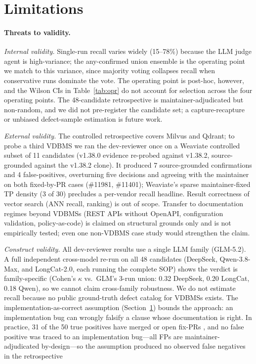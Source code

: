 \documentclass[sigconf]{acmart}
\begin{document}
\section{Limitations}
\label{sec:limit}

\paragraph{Threats to validity.}
\emph{Internal validity.} Single-run recall varies widely (15--78\%) because the LLM judge agent is high-variance; the any-confirmed union ensemble is the operating point we match to this variance, since majority voting collapses recall when conservative runs dominate the vote. The operating point is post-hoc, however, and the Wilson CIs in Table~\ref{tab:opr} do not account for selection across the four operating points. The 48-candidate retrospective is maintainer-adjudicated but non-random, and we did not pre-register the candidate set; a capture-recapture or unbiased defect-sample estimation is future work.

\emph{External validity.} The controlled retrospective covers Milvus and Qdrant; to probe a third VDBMS we ran the dev-reviewer once on a Weaviate controlled subset of 11 candidates (v1.38.0 evidence re-probed against v1.38.2, source-grounded against the v1.38.2 clone). It produced 7 source-grounded confirmations and 4 false-positives, overturning five  decisions and agreeing with the maintainer on both fixed-by-PR cases (\#11981, \#11401); Weaviate's sparse maintainer-fixed TP density (3 of 30) precludes a per-vendor recall headline. Result correctness of vector search (ANN recall, ranking) is out of scope. Transfer to documentation regimes beyond VDBMSs (REST APIs without OpenAPI, configuration validation, policy-as-code) is claimed on structural grounds only and is not empirically tested; even one non-VDBMS case study would strengthen the claim.

\emph{Construct validity.} All dev-reviewer results use a single LLM family (GLM-5.2). A full independent cross-model re-run on all 48 candidates (DeepSeek, Qwen-3.8-Max, and LongCat-2.0, each running the complete SOP) shows the verdict is family-specific (Cohen's $\kappa$ vs.\ GLM's 3-run union: 0.32 DeepSeek, 0.20 LongCat, 0.18 Qwen), so we cannot claim cross-family robustness. We do not estimate recall because no public ground-truth defect catalog for VDBMSs exists. The implementation-as-correct assumption (Section~\ref{sec:limit}) bounds the approach: an implementation bug can wrongly falsify a clause whose documentation is right. In practice, 31 of the 50 true positives have merged or open fix-PRs , and no false positive was traced to an implementation bug---all FPs are maintainer-adjudicated by-design---so the assumption produced no observed false negatives in the retrospective
\end{document}
